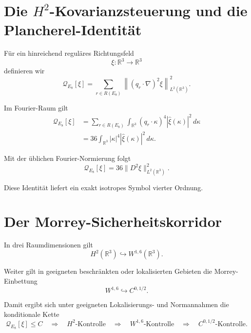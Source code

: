 \documentclass[11pt,twoside,a4paper]{article}
\begin{document}
	\section{Die $H^2$-Kovarianzsteuerung und die Plancherel-Identität}
	
	Für ein hinreichend reguläres Richtungsfeld
	\[
	\xi:
	\mathbb{R}^3
	\to
	\mathbb{R}^3
	\]
	definieren wir
	\begin{equation}
		\mathcal{Q}_{E_8}[\xi]
		=
		\sum_{r\in R(E_8)}
		\left\|
		(q_r\cdot\nabla)^2\xi
		\right\|_{L^2(\mathbb{R}^3)}^2.
	\end{equation}
	
	Im Fourier-Raum gilt
	\begin{align}
		\mathcal{Q}_{E_8}[\xi]
		&=
		\sum_{r\in R(E_8)}
		\int_{\mathbb{R}^3}
		(q_r\cdot\kappa)^4
		|\widehat{\xi}(\kappa)|^2
		\,d\kappa
		\\
		&=
		36
		\int_{\mathbb{R}^3}
		|\kappa|^4
		|\widehat{\xi}(\kappa)|^2
		\,d\kappa.
	\end{align}
	
	Mit der üblichen Fourier-Normierung folgt
	\begin{equation}
		\boxed{
			\mathcal{Q}_{E_8}[\xi]
			=
			36
			\|D^2\xi\|_{L^2(\mathbb{R}^3)}^2.
		}
	\end{equation}
	
	Diese Identität liefert ein exakt isotropes Symbol vierter Ordnung.
	
	\section{Der Morrey-Sicherheitskorridor}
	
	In drei Raumdimensionen gilt
	\begin{equation}
		H^2(\mathbb{R}^3)
		\hookrightarrow
		W^{1,6}(\mathbb{R}^3).
	\end{equation}
	
	Weiter gilt in geeigneten beschränkten oder lokalisierten Gebieten die Morrey-Einbettung
	\begin{equation}
		W^{1,6}
		\hookrightarrow
		C^{0,1/2}.
	\end{equation}
	
	Damit ergibt sich unter geeigneten Lokalisierungs- und Normannahmen die konditionale Kette
	\begin{equation}
		\boxed{
			\mathcal{Q}_{E_8}[\xi]
			\le C
			\quad\Longrightarrow\quad
			H^2\text{-Kontrolle}
			\quad\Longrightarrow\quad
			W^{1,6}\text{-Kontrolle}
			\quad\Longrightarrow\quad
			C^{0,1/2}\text{-Kontrolle}.
		}
	\end{equation}
	
\end{document}
